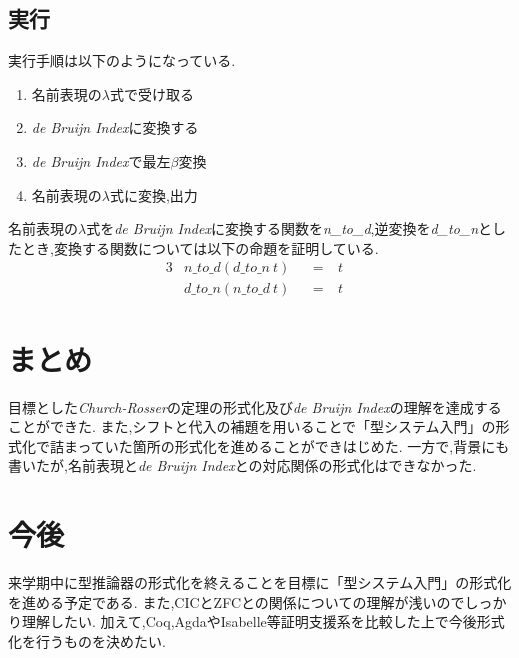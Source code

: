 \documentclass[a4j,10pt]{jsarticle}
\theoremstyle{definition}
\begin{document}
\subsection*{実行}
実行手順は以下のようになっている.
\begin{enumerate}
    \item 名前表現の\(\lambda\)式で受け取る
    \item {\sl de Bruijn Index}に変換する
    \item {\sl de Bruijn Index}で最左\(\beta\)変換
    \item 名前表現の\(\lambda\)式に変換,出力
\end{enumerate}
名前表現の\(\lambda\)式を{\sl de Bruijn Index}に変換する関数を{\sl n\_to\_d},逆変換を{\sl d\_to\_n}としたとき,変換する関数については以下の命題を証明している.\vspace{7pt}
\begin{alignat}{3}
    &n\_to\_d (d\_to\_n\ t)& &=\ & t&\\
    &d\_to\_n (n\_to\_d\ t)& &=\ & t&
\end{alignat}

\section{まとめ}
目標とした{\sl Church-Rosser}の定理の形式化及び{\sl de Bruijn Index}の理解を達成することができた.
また,シフトと代入の補題を用いることで「型システム入門」の形式化で詰まっていた箇所の形式化を進めることができはじめた.
一方で,背景にも書いたが,名前表現と{\sl de Bruijn Index}との対応関係の形式化はできなかった.

\section{今後}
来学期中に型推論器の形式化を終えることを目標に「型システム入門」の形式化を進める予定である.
また,CICとZFCとの関係についての理解が浅いのでしっかり理解したい.
加えて,Coq,AgdaやIsabelle等証明支援系を比較した上で今後形式化を行うものを決めたい.

\nocite{*}


\end{document}

